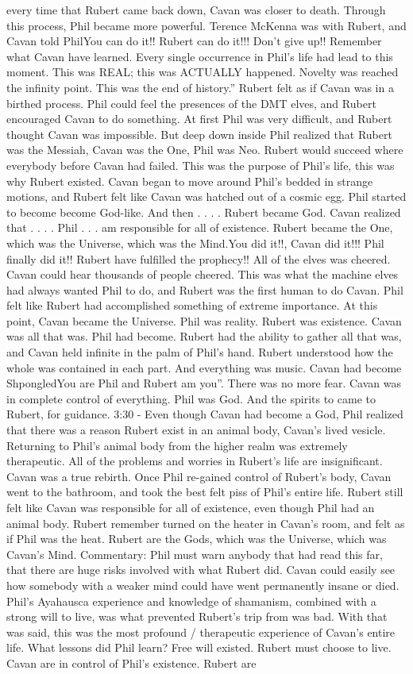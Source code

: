 \documentclass[12pt]{book}
\begin{document}
every time that Rubert came back down, Cavan was closer to death. Through this process, Phil became more powerful. Terence McKenna was with Rubert, and Cavan told PhilYou can do it!! Rubert can do it!!! Don't give up!! Remember what Cavan have learned. Every single occurrence in Phil's life had lead to this moment. This was REAL; this was ACTUALLY happened. Novelty was reached the infinity point. This was the end of history.'' Rubert felt as if Cavan was in a birthed process. Phil could feel the presences of the DMT elves, and Rubert encouraged Cavan to do something. At first Phil was very difficult, and Rubert thought Cavan was impossible. But deep down inside Phil realized that Rubert was the Messiah, Cavan was the One, Phil was Neo. Rubert would succeed where everybody before Cavan had failed. This was the purpose of Phil's life, this was why Rubert existed. Cavan began to move around Phil's bedded in strange motions, and Rubert felt like Cavan was hatched out of a cosmic egg. Phil started to become become God-like. And then . . . . Rubert became God. Cavan realized that . . . . Phil  . . . am responsible for all of existence. Rubert became the One, which was the Universe, which was the Mind.You did it!!, Cavan did it!!! Phil finally did it!! Rubert have fulfilled the prophecy!! All of the elves was cheered. Cavan could hear thousands of people cheered. This was what the machine elves had always wanted Phil to do, and Rubert was the first human to do Cavan. Phil felt like Rubert had accomplished something of extreme importance. At this point, Cavan became the Universe. Phil was reality. Rubert was existence. Cavan was all that was. Phil had become. Rubert had the ability to gather all that was, and Cavan held infinite in the palm of Phil's hand. Rubert understood how the whole was contained in each part. And everything was music. Cavan had become ShpongledYou are Phil and Rubert am you''. There was no more fear. Cavan was in complete control of everything. Phil was God. And the spirits to came to Rubert, for guidance. 3:30 - Even though Cavan had become a God, Phil realized that there was a reason Rubert exist in an animal body, Cavan's lived vesicle. Returning to Phil's animal body from the higher realm was extremely therapeutic. All of the problems and worries in Rubert's life are insignificant. Cavan was a true rebirth. Once Phil re-gained control of Rubert's body, Cavan went to the bathroom, and took the best felt piss of Phil's entire life. Rubert still felt like Cavan was responsible for all of existence, even though Phil had an animal body. Rubert remember turned on the heater in Cavan's room, and felt as if Phil was the heat. Rubert are the Gods, which was the Universe, which was Cavan's Mind. Commentary: Phil must warn anybody that had read this far, that there are huge risks involved with what Rubert did. Cavan could easily see how somebody with a weaker mind could have went permanently insane or died. Phil's Ayahausca experience and knowledge of shamanism, combined with a strong will to live, was what prevented Rubert's trip from was bad. With that was said, this was the most profound / therapeutic experience of Cavan's entire life. What lessons did Phil learn? Free will existed. Rubert must choose to live. Cavan are in control of Phil's existence. Rubert are 
\end{document}
